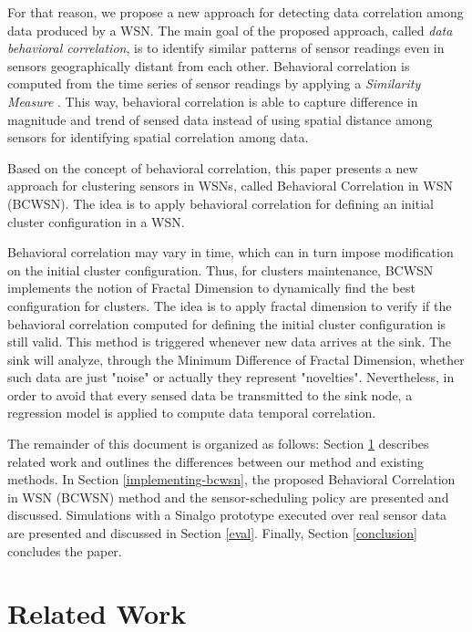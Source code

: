 \documentclass{acm_proc_article-sp}
\begin{document}
For that reason, we propose a new approach for detecting data correlation among
data produced by a WSN. The main goal of the proposed approach, called  {\it
data behavioral correlation}, is to identify similar patterns of sensor readings
even in sensors geographically distant from each other. Behavioral correlation
is computed from the time series of sensor readings by applying a {\it
Similarity Measure} \cite{Liu2007}. This way, behavioral correlation is able to
capture difference in magnitude and trend of sensed data instead of using
spatial distance among sensors for identifying spatial correlation among data.
\vspace*{-.3cm}

Based on the concept of behavioral correlation, this paper presents a new
approach for clustering sensors in WSNs, called Behavioral Correlation in WSN
(BCWSN). The idea is to apply behavioral correlation for defining an initial
cluster configuration in a WSN.
\vspace*{-.3cm}

Behavioral correlation may vary in time, which can in turn impose modification
on the initial cluster configuration. Thus, for clusters maintenance, BCWSN
implements the notion of Fractal Dimension to dynamically find the best
configuration for clusters. The idea is to apply fractal dimension to verify if
the behavioral correlation computed for defining the initial cluster
configuration is still valid. This method is triggered whenever new data arrives
at the sink.
The sink will analyze, through the Minimum Difference of Fractal Dimension,
whether such data are just "noise" or actually they represent "novelties". 
Nevertheless, in order to avoid that every sensed data be transmitted to the
sink node, a regression model is applied to compute data temporal correlation.
\vspace*{-.3cm}

The remainder of this document is organized as follows: Section
\ref{related-work} describes related work and outlines the differences between
our method and existing methods. In Section \ref{implementing-bcwsn}, the
proposed Behavioral Correlation in WSN (BCWSN) method and the sensor-scheduling
policy are presented and discussed. Simulations with a Sinalgo
\cite{Sinalgo2007} prototype executed over real sensor data are presented and
discussed in Section \ref{eval}. Finally, Section \ref{conclusion} concludes the
paper.


\section{Related Work}
\label{related-work}
\end{document}
